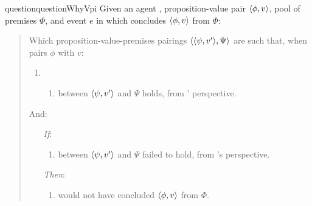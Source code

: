 \begin{note}

   \begin{restatable}[\qWhyV{}]{question}{questionWhyVpi}
    \label{q:why:v:pi}
    Given an agent \vAgent{}, proposition-value pair \(\langle \phi, v \rangle\), pool of premises \(\Phi\), and event \(e\) in which \vAgent{} concludes \(\langle \phi, v \rangle\) from \(\Phi\):

    \begin{quote}
      Which proposition-value-premises pairings \(\langle \langle \psi, v' \rangle, \Psi \rangle\) are such that, when \vAgent{} pairs \(\phi\) with \(v\):

      \begin{enumerate}[label=]
      \item
        \begin{enumerate}[label=\alph*., ref=(\alph*), series=qWhyVDef]
        \item
           between \(\langle \psi, v' \rangle\) and \(\Psi\) holds, from \vAgent{}' perspective.
        \end{enumerate}
      \end{enumerate}

      And:

      \begin{enumerate}
      \item[\emph{If}:]
        \begin{enumerate}[label=\alph*., ref=(\alph*), resume*=qWhyVDef]
        \item
           between \(\langle \psi, v' \rangle\) and \(\Psi\) failed to hold, from \vAgent{}'s perspective.
        \end{enumerate}
      \item[\emph{Then}:]
        \begin{enumerate}[label=\alph*., ref=(\alph*), resume*=qWhyVDef]
        \item
          \vAgent{} would not have concluded \(\langle \phi, v \rangle\) from \(\Phi\).
        \end{enumerate}
      \end{enumerate}
    \end{quote}
    \vspace{-\baselineskip}
  \end{restatable}

\end{note}

